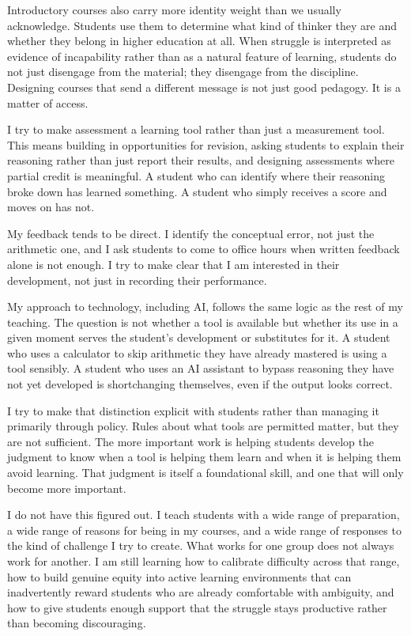 \documentclass[10pt]{article}
\begin{document}
Introductory courses also carry more identity weight than we usually acknowledge. Students
use them to determine what kind of thinker they are and whether they belong in higher
education at all. When struggle is interpreted as evidence of incapability rather than as a
natural feature of learning, students do not just disengage from the material; they disengage
from the discipline. Designing courses that send a different message is not just good
pedagogy. It is a matter of access.


I try to make assessment a learning tool rather than just a measurement tool. This means
building in opportunities for revision, asking students to explain their reasoning rather than
just report their results, and designing assessments where partial credit is meaningful. A
student who can identify where their reasoning broke down has learned something. A student who
simply receives a score and moves on has not.

My feedback tends to be direct. I identify the conceptual error, not just the arithmetic one,
and I ask students to come to office hours when written feedback alone is not enough. I try to
make clear that I am interested in their development, not just in recording their performance.


My approach to technology, including AI, follows the same logic as the rest of my teaching.
The question is not whether a tool is available but whether its use in a given moment serves
the student's development or substitutes for it. A student who uses a calculator to skip
arithmetic they have already mastered is using a tool sensibly. A student who uses an AI
assistant to bypass reasoning they have not yet developed is shortchanging themselves, even if
the output looks correct.

I try to make that distinction explicit with students rather than managing it primarily
through policy. Rules about what tools are permitted matter, but they are not sufficient. The
more important work is helping students develop the judgment to know when a tool is helping
them learn and when it is helping them avoid learning. That judgment is itself a foundational
skill, and one that will only become more important.


I do not have this figured out. I teach students with a wide range of preparation, a wide
range of reasons for being in my courses, and a wide range of responses to the kind of
challenge I try to create. What works for one group does not always work for another. I am
still learning how to calibrate difficulty across that range, how to build genuine equity into
active learning environments that can inadvertently reward students who are already
comfortable with ambiguity, and how to give students enough support that the struggle stays
productive rather than becoming discouraging.
\end{document}
